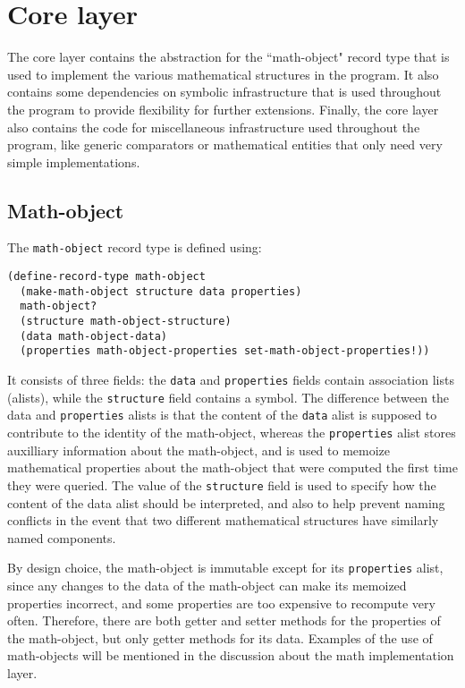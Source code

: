 \documentclass{article}
\begin{document}
    
    \section{Core layer}
        
        The core layer contains the abstraction for the ``math-object" record type that is used to implement the various mathematical structures in the program. It also contains some dependencies on symbolic infrastructure that is used throughout the program to provide flexibility for further extensions. Finally, the core layer also contains the code for miscellaneous infrastructure used throughout the program, like generic comparators or mathematical entities that only need very simple implementations.
        
        \subsection{Math-object}
            
            The \verb+math-object+ record type is defined using:
\begin{verbatim}
(define-record-type math-object
  (make-math-object structure data properties)
  math-object?
  (structure math-object-structure)
  (data math-object-data)
  (properties math-object-properties set-math-object-properties!))
\end{verbatim}
            It consists of three fields: the \verb+data+ and \verb+properties+ fields contain association lists (alists), while the \verb+structure+ field contains a symbol. The difference between the data and \verb+properties+ alists is that the content of the \verb+data+ alist is supposed to contribute to the identity of the math-object, whereas the \verb+properties+ alist stores auxilliary information about the math-object, and is used to memoize mathematical properties about the math-object that were computed the first time they were queried. The value of the \verb+structure+ field is used to specify how the content of the data alist should be interpreted, and also to help prevent naming conflicts in the event that two different mathematical structures have similarly named components.
            
            By design choice, the math-object is immutable except for its \verb+properties+ alist, since any changes to the data of the math-object can make its memoized properties incorrect, and some properties are too expensive to recompute very often. Therefore, there are both getter and setter methods for the properties of the math-object, but only getter methods for its data. Examples of the use of math-objects will be mentioned in the discussion about the math implementation layer.
        
\end{document}
